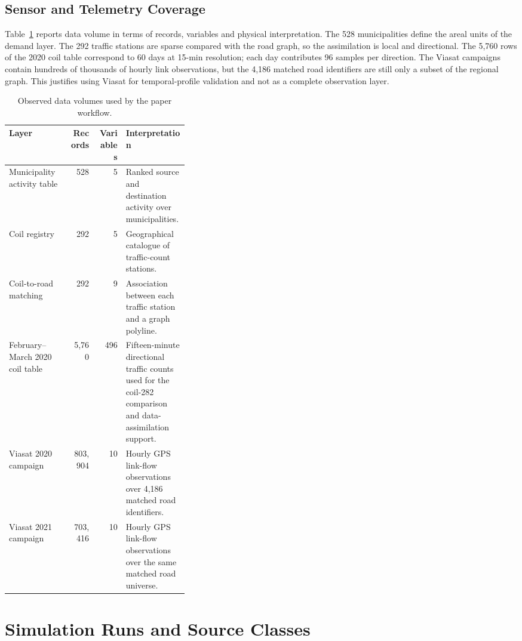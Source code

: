 \documentclass[11pt,a4paper]{article}
\begin{document}
\subsection{Sensor and Telemetry Coverage}

Table~\ref{tab:data-volumes} reports data volume in terms of records, variables and physical interpretation. The 528 municipalities define the areal units of the demand layer. The 292 traffic stations are sparse compared with the road graph, so the assimilation is local and directional. The 5,760 rows of the 2020 coil table correspond to 60 days at 15-min resolution; each day contributes 96 samples per direction. The Viasat campaigns contain hundreds of thousands of hourly link observations, but the 4,186 matched road identifiers are still only a subset of the regional graph. This justifies using Viasat for temporal-profile validation and not as a complete observation layer.

\begin{table}[htbp]
\centering
\caption{Observed data volumes used by the paper workflow.}
\label{tab:data-volumes}
\begin{tabular}{@{}lrrp{0.35\linewidth}@{}}
\toprule
Layer & Records & Variables & Interpretation \\
\midrule
Municipality activity table & 528 & 5 & Ranked source and destination
activity over municipalities. \\
Coil registry & 292 & 5 & Geographical catalogue of traffic-count stations. \\
Coil-to-road matching & 292 & 9 & Association between each traffic station
and a graph polyline. \\
February--March 2020 coil table & 5,760 & 496 & Fifteen-minute directional
traffic counts used for the coil-282 comparison and data-assimilation support. \\
Viasat 2020 campaign & 803,904 & 10 & Hourly GPS link-flow observations over
4,186 matched road identifiers. \\
Viasat 2021 campaign & 703,416 & 10 & Hourly GPS link-flow observations over
the same matched road universe. \\
\bottomrule
\end{tabular}
\end{table}

\section{Simulation Runs and Source Classes}
\label{sec:simulation-runs}
\end{document}
